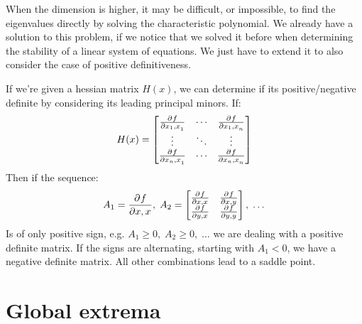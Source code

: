 When the dimension is higher, it may be difficult, or impossible, to find the eigenvalues directly by solving the characteristic polynomial. We already have a solution to this problem, if we notice that we solved it before when determining the stability of a linear system of equations. We just have to extend it to also consider the case of positive definitiveness.

{
    If we're given a hessian matrix $H(x)$, we can determine if its positive/negative definite by considering its leading principal minors.
If:
\begin{equation}
            H(x) = \begin{bmatrix}
            \frac{\partial^{}f}{\partial x_1,x_1^{}} & \cdots & \frac{\partial^{}f}{\partial x_1,x_n^{}}\\
            \vdots & \ddots & \vdots\\
            \frac{\partial^{}f}{\partial x_n,x_1^{}} & \cdots &\frac{\partial^{}f}{\partial x_n,x_n^{}}\\
            \end{bmatrix}
\end{equation}
Then if the sequence:
\begin{equation}
    A_1 = \pdv{f}{x,x},\; A_2 =  \begin{bmatrix}
                \pdv{f}{x,x} & \pdv{f}{x,y} \\
                \pdv{f}{y,x} & \pdv{f}{y,y}
        \end{bmatrix}, \; \dots

\end{equation}
Is of only positive sign, e.g. $A_1 \ge 0,\; A_2 \ge 0,\; \dots$ we are dealing with a positive definite matrix.  If the signs are alternating, starting with $A_1 < 0$, we have a negative definite matrix. All other combinations lead to a saddle point.

}



\section{Global extrema}

